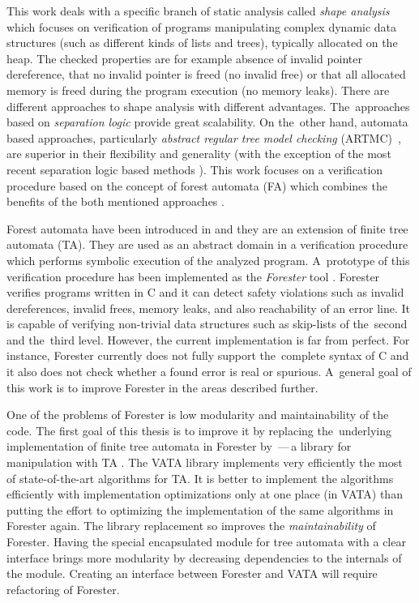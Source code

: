 This work deals with a specific branch of static analysis called \emph{shape analysis} which focuses on verification of programs manipulating
complex dynamic data structures (such as different kinds of lists and trees), typically allocated on the heap.
The checked properties are for example absence of invalid pointer dereference,
that no invalid pointer is freed (no invalid free) or
that all allocated memory is freed during the program execution (no memory leaks).
There are different approaches to shape analysis with different advantages.
The~approaches based on \emph{separation logic} \cite{seplog,seplog07} provide great scalability.
On the~other hand, automata based approaches, particularly \emph{abstract regular tree model checking} (ARTMC)~\cite{artmc}, are
superior in their flexibility and generality (with the exception of
the most recent separation logic based methods \cite{biabduction}).
This work focuses on a verification procedure based on the concept of forest automata (FA) which
combines the benefits of the both mentioned approaches \cite{forester11}.

Forest automata have been introduced in \cite{forester11} and
they are an extension of finite tree automata (TA).
They are used as an abstract domain in a verification procedure which performs symbolic execution of the analyzed program.
A~prototype of this verification procedure has been implemented as the \emph{Forester} tool	\cite{www:forester}.
Forester verifies programs written in C and it can detect safety violations such as invalid dereferences, invalid frees,
memory leaks, and also reachability of an error line.
It is capable of verifying non-trivial data structures such as skip-lists of the~second and the~third level.
However, the current implementation is far from perfect.
For instance, Forester currently does not fully support the~complete syntax of C and %
it also does not check whether a found error is real or spurious.
A~general goal of this work is to improve Forester in the areas described further.

One of the problems of Forester is low modularity and maintainability of the code.
The first goal of this thesis is to improve it by replacing the~underlying implementation
of finite tree automata in Forester by \vata\,---\,a library for manipulation with TA \cite{libvata}.
The VATA library implements very efficiently the most of state-of-the-art algorithms for TA.
It is better to implement the algorithms efficiently with implementation optimizations
only at one place (in VATA) than putting the effort to optimizing the implementation
of the same algorithms in Forester again.
The library replacement so improves the \emph{maintainability} of Forester.
Having the special encapsulated module for tree automata with a clear interface
brings more modularity by decreasing dependencies to the internals of
the module.
Creating an interface between Forester and VATA will require refactoring of Forester.

